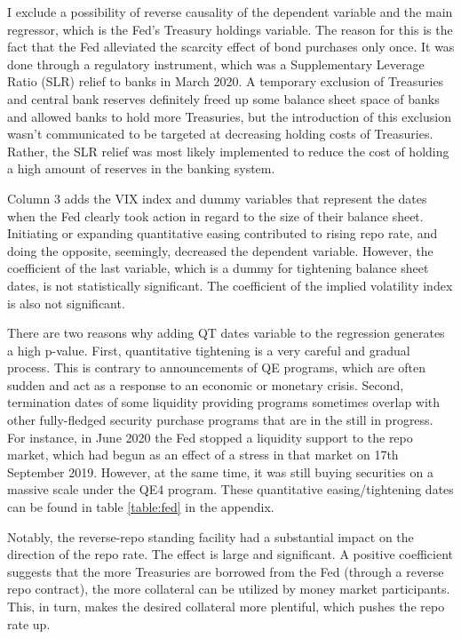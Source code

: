 \documentclass[11pt,a4paper,english,oneside]{article}
\begin{document}
I exclude a possibility of reverse causality of the dependent variable and the main regressor, which is the Fed's Treasury holdings variable. The reason for this is the fact that the Fed alleviated the scarcity effect of bond purchases only once. It was done through a regulatory instrument, which was a Supplementary Leverage Ratio (SLR) relief to banks in March 2020. A temporary exclusion of Treasuries and central bank reserves definitely freed up some balance sheet space of banks and allowed banks to hold more Treasuries, but the introduction of this exclusion wasn't communicated to be targeted at decreasing holding costs of Treasuries. Rather, the SLR relief was most likely implemented to reduce the cost of holding a high amount of reserves in the banking system.


Column 3 adds the VIX index and dummy variables that represent the dates when the Fed clearly took action in regard to the size of their balance sheet. Initiating or expanding quantitative easing contributed to rising repo rate, and doing the opposite, seemingly, decreased the dependent variable. However, the coefficient of the last variable, which is a dummy for tightening balance sheet dates, is not statistically significant. The coefficient of the implied volatility index is also not significant.

There are two reasons why adding QT dates variable to the regression generates a high p-value. First, quantitative tightening is a very careful and gradual process. This is contrary to announcements of QE programs, which are often sudden and act as a response to an economic or monetary crisis. Second, termination dates of some liquidity providing programs sometimes overlap with other fully-fledged security purchase programs that are in the still in progress. For instance, in June 2020 the Fed stopped a liquidity support to the repo market, which had begun as an effect of a stress in that market on 17th September 2019. However, at the same time, it was still buying securities on a massive scale under the QE4 program. These quantitative easing/tightening dates can be found in table \ref{table:fed} in the appendix.

Notably, the reverse-repo standing facility had a substantial impact on the direction of the repo rate. The effect is large and significant. A positive coefficient suggests that the more Treasuries are borrowed from the Fed (through a reverse repo contract), the more collateral can be utilized by money market participants. This, in turn, makes the desired collateral more plentiful, which pushes the repo rate up.
\end{document}
